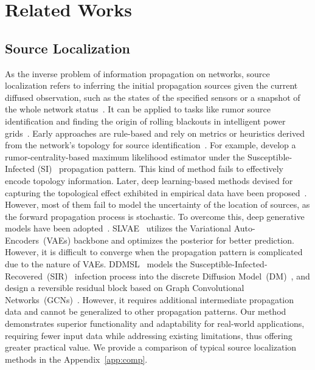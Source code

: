 \section{Related Works}
\label{r_w}
\subsection{Source Localization}
As the inverse problem of information propagation on networks, source localization refers to inferring the initial propagation sources given the current diffused observation, such as the states of the specified sensors or a snapshot of the whole network status~\citep{shelke2019source}. It can be applied to tasks like rumor source identification and finding the origin of rolling blackouts in intelligent power grids~\citep{shelke2019source}. Early approaches are rule-based and rely on metrics or heuristics derived from the network’s
topology for source identification~\citep{shah2011rumors,zhu2014information,zhu2014robust}. For example, \citet{shah2011rumors} develop a rumor-centrality-based maximum likelihood estimator under the Susceptible-Infected (SI)~\citep{kermack1927contribution} propagation pattern. This kind of method fails to effectively encode topology information. Later, deep learning-based methods devised for capturing the topological effect exhibited in
empirical data have been proposed~\citep{lappas2010finding,luo2013identifying,wang2017multiple,dong2019multiple,wang2022invertible,hou2024new}. However, most of them fail to model the uncertainty of the location of sources, as the forward propagation process is stochastic. To overcome this, deep generative models have been adopted~\cite{ling2022source,yan2024diffusion,wang2024joint,xu2024pgsl,huang2023two}. SLVAE~\citep{ling2022source} utilizes the Variational Auto-Encoders~(VAEs) backbone and optimizes the posterior for better prediction. However, it is difficult to converge when the propagation pattern is complicated due to the nature of VAEs. DDMSL~\citep{yan2024diffusion} models the Susceptible-Infected-Recovered~(SIR) ~\citep{kermack1927contribution}infection process into the discrete Diffusion Model~(DM)~\citep{ho2020denoising}, and design a reversible residual block based on Graph Convolutional Networks~(GCNs)~\citep{kipf2016semi}. However, it requires additional intermediate propagation data and cannot be generalized to other propagation patterns. Our method demonstrates superior functionality and adaptability for real-world applications, requiring fewer input data while addressing existing limitations, thus offering greater practical value. {We provide a comparison of typical source localization methods in the Appendix~\ref{app:comp}.} 

